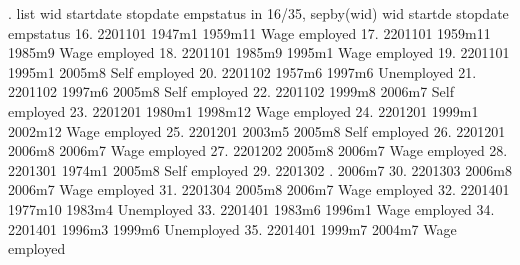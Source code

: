 . list wid startdate stopdate empstatus  in 16/35, sepby(wid)
{\smallskip}
     {\TLC}
     {\VBAR}     wid   startd{\tytilde}e   stopdate       empstatus {\VBAR}
     {\LFTT}
 16. {\VBAR} 2201101     1947m1    1959m11   Wage employed {\VBAR}
 17. {\VBAR} 2201101    1959m11     1985m9   Wage employed {\VBAR}
 18. {\VBAR} 2201101     1985m9     1995m1   Wage employed {\VBAR}
 19. {\VBAR} 2201101     1995m1     2005m8   Self employed {\VBAR}
     {\LFTT}
 20. {\VBAR} 2201102     1957m6     1997m6      Unemployed {\VBAR}
 21. {\VBAR} 2201102     1997m6     2005m8   Self employed {\VBAR}
 22. {\VBAR} 2201102     1999m8     2006m7   Self employed {\VBAR}
     {\LFTT}
 23. {\VBAR} 2201201     1980m1    1998m12   Wage employed {\VBAR}
 24. {\VBAR} 2201201     1999m1    2002m12   Wage employed {\VBAR}
 25. {\VBAR} 2201201     2003m5     2005m8   Self employed {\VBAR}
 26. {\VBAR} 2201201     2006m8     2006m7   Wage employed {\VBAR}
     {\LFTT}
 27. {\VBAR} 2201202     2005m8     2006m7   Wage employed {\VBAR}
     {\LFTT}
 28. {\VBAR} 2201301     1974m1     2005m8   Self employed {\VBAR}
     {\LFTT}
 29. {\VBAR} 2201302          .     2006m7                 {\VBAR}
     {\LFTT}
 30. {\VBAR} 2201303     2006m8     2006m7   Wage employed {\VBAR}
     {\LFTT}
 31. {\VBAR} 2201304     2005m8     2006m7   Wage employed {\VBAR}
     {\LFTT}
 32. {\VBAR} 2201401    1977m10     1983m4      Unemployed {\VBAR}
 33. {\VBAR} 2201401     1983m6     1996m1   Wage employed {\VBAR}
 34. {\VBAR} 2201401     1996m3     1999m6      Unemployed {\VBAR}
 35. {\VBAR} 2201401     1999m7     2004m7   Wage employed {\VBAR}
     {\BLC}
